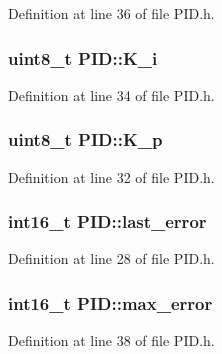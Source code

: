 Definition at line 36 of file P\+I\+D.\+h.

\subsubsection[{\texorpdfstring{K\+\_\+i}{K_i}}]{\setlength{\rightskip}{0pt plus 5cm}uint8\+\_\+t P\+I\+D\+::\+K\+\_\+i}\hypertarget{struct_p_i_d_a598391a8fd61e53bc87b684e0bba712f}{}\label{struct_p_i_d_a598391a8fd61e53bc87b684e0bba712f}


Definition at line 34 of file P\+I\+D.\+h.

\subsubsection[{\texorpdfstring{K\+\_\+p}{K_p}}]{\setlength{\rightskip}{0pt plus 5cm}uint8\+\_\+t P\+I\+D\+::\+K\+\_\+p}\hypertarget{struct_p_i_d_a394199480a053023b60037ec30b3d5fd}{}\label{struct_p_i_d_a394199480a053023b60037ec30b3d5fd}


Definition at line 32 of file P\+I\+D.\+h.

\subsubsection[{\texorpdfstring{last\+\_\+error}{last_error}}]{\setlength{\rightskip}{0pt plus 5cm}int16\+\_\+t P\+I\+D\+::last\+\_\+error}\hypertarget{struct_p_i_d_a242dbdb4ae8fe619dd26651e9e538a6a}{}\label{struct_p_i_d_a242dbdb4ae8fe619dd26651e9e538a6a}


Definition at line 28 of file P\+I\+D.\+h.

\subsubsection[{\texorpdfstring{max\+\_\+error}{max_error}}]{\setlength{\rightskip}{0pt plus 5cm}int16\+\_\+t P\+I\+D\+::max\+\_\+error}\hypertarget{struct_p_i_d_a99bc0d7835e0e95a7aaca1b4b52c1080}{}\label{struct_p_i_d_a99bc0d7835e0e95a7aaca1b4b52c1080}


Definition at line 38 of file P\+I\+D.\+h.

